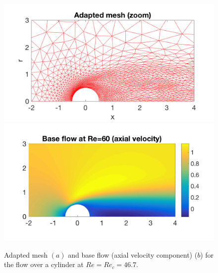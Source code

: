 \documentclass[twocolumn,10pt]{asme2ej}
\begin{document}
\begin{figure}
\includegraphics[width=.9 \linewidth]{Cylinder_Mesh.png}
\includegraphics[width=.9 \linewidth]{Cylinder_BaseFlowRe60.png}
\caption{Adapted mesh $(a)$  and base flow (axial velocity component) ($b$) for the flow over a cylinder at $Re=Re_c = 46.7$.}
\label{fig:Baseflow}
\end{figure}
\end{document}
